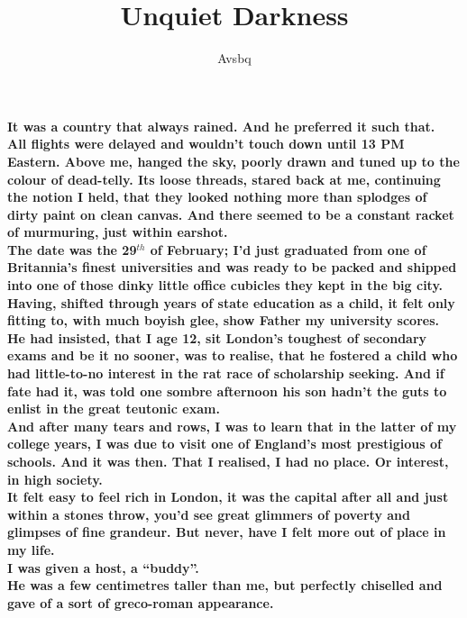 \documentclass{book}
\begin{document}
\title{\textbf{Unquiet Darkness}}
\author{Avsbq}
\date{}
\maketitle
\LARGE{
\textbf{
It was a country that always rained.
And he preferred it such that.\\
All flights were delayed and wouldn't touch down
until 13 PM Eastern.
Above me, hanged the sky, poorly drawn and tuned up to the colour of dead-telly.
Its loose threads, stared back at me, continuing
the notion I held, that they looked nothing more than splodges of dirty
paint on clean canvas. And there seemed
to be a constant racket of murmuring,
just within earshot.\\
The date was the 29$^{th}$ of February;
I'd just graduated from one of Britannia's
finest universities and was ready to be packed and shipped
into one of those dinky little office cubicles
they kept in the big city.\\
Having, shifted through years of state education
as a child, it felt only fitting to, with much
boyish glee, show Father my university scores.\\
He had insisted, that I age 12, sit London's toughest of
secondary exams and be it no sooner, was to realise,
that he fostered a child who had little-to-no interest
in the rat race of scholarship seeking.
And if fate had it, was told one sombre afternoon
his son hadn't the guts to enlist in the great
teutonic exam.\\
And after many tears and rows, I was to learn that
in the latter of my college years, I was due to visit one of
England's most prestigious of schools. And it was then.
That I realised, I had no place. Or interest, in high society.\\
It felt easy to feel rich in London, it was the capital after all
and just within a stones throw, you'd see great glimmers of poverty
and glimpses of fine grandeur.
But never, have I felt more out of place in my life.\\
I was given a host, a ``buddy''.\\
He was a few centimetres taller than me, but
perfectly chiselled and gave of a sort of greco-roman appearance.
}}
\end{document}
